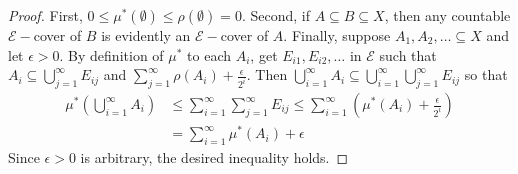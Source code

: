 \documentclass[11pt, a4paper]{memoir}
\theoremstyle{change}
\theoremstyle{plain}
\theoremstyle{nonumberplain}
\newtheorem{proof}{Proof}
\numberwithin{equation}{section}
\begin{document}
\begin{proof}
    First, $0\leq\mu^*(\emptyset)\leq\rho(\emptyset)=0$.
    Second, if $A\subseteq B\subseteq X$, then any countable $\mathcal{E}-$cover of $B$ is evidently an $\mathcal{E}-$cover of $A$.
    Finally, suppose $A_1,A_2,\ldots\subseteq X$ and let $\epsilon>0$.
    By definition of $\mu^*$ to each $A_i$, get $E_{i1},E_{i2},\ldots$ in $\mathcal{E}$ such that $A_i\subseteq\bigcup_{j=1}^\infty E_{ij}$ and $\sum_{j=1}^\infty \rho(A_i)+\frac{\epsilon}{2^i}$.
    Then $\bigcup_{i=1}^\infty A_i\subseteq\bigcup_{i=1}^\infty\bigcup_{j=1}^\infty E_{ij}$ so that
    \begin{align*}
        \mu^*\left(\bigcup\limits_{i=1}^\infty A_i\right) &\leq\sum\limits_{i=1}^\infty\sum\limits_{j=1}^\infty E_{ij} \leq \sum\limits_{i=1}^\infty\left(\mu^*(A_i)+\frac{\epsilon}{2^i}\right)\\
                                                          &= \sum\limits_{i=1}^\infty \mu^*(A_i)+\epsilon
    \end{align*}
    Since $\epsilon>0$ is arbitrary, the desired inequality holds.
\end{proof}
\end{document}
